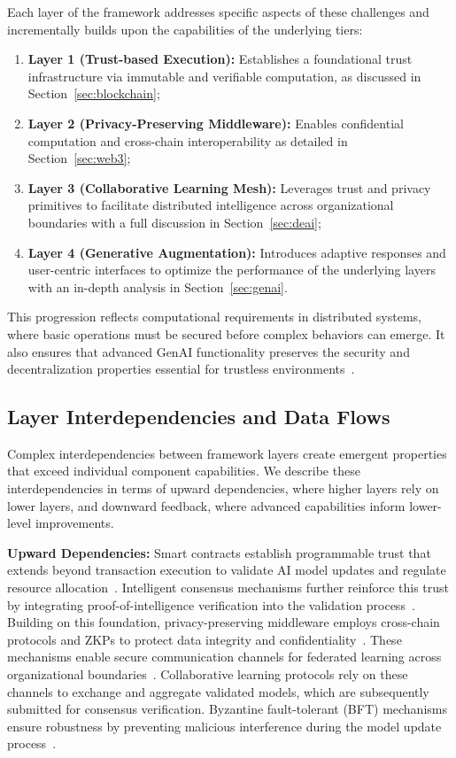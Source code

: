 \documentclass[5p,twocolumn]{elsarticle}
\begin{document}
Each layer of the framework addresses specific aspects of these challenges and incrementally builds upon the capabilities of the underlying tiers:
\begin{enumerate}
    \item \textbf{Layer 1 (Trust-based Execution):} Establishes a foundational trust infrastructure via immutable and verifiable computation, as discussed in Section~\ref{sec:blockchain};
    \item \textbf{Layer 2 (Privacy-Preserving Middleware):} Enables confidential computation and cross-chain interoperability as detailed in Section~\ref{sec:web3};
    \item \textbf{Layer 3 (Collaborative Learning Mesh):} Leverages trust and privacy primitives to facilitate distributed intelligence across organizational boundaries with a full discussion in Section~\ref{sec:deai};
    \item \textbf{Layer 4 (Generative Augmentation):} Introduces adaptive responses and user-centric interfaces to optimize the performance of the underlying layers with an in-depth analysis in Section~\ref{sec:genai}.
\end{enumerate}
This progression reflects computational requirements in distributed systems, where basic operations must be secured before complex behaviors can emerge. It also ensures that advanced GenAI functionality preserves the security and decentralization properties essential for trustless environments~\cite{luo2024survey,javadpour2024decentralized}.

\subsection{Layer Interdependencies and Data Flows}
Complex interdependencies between framework layers create emergent properties that exceed individual component capabilities. We describe these interdependencies in terms of upward dependencies, where higher layers rely on lower layers, and downward feedback, where advanced capabilities inform lower-level improvements.

\textbf{Upward Dependencies:} Smart contracts establish programmable trust that extends beyond transaction execution to validate AI model updates and regulate resource allocation~\cite{swain2025smart}. Intelligent consensus mechanisms further reinforce this trust by integrating proof-of-intelligence verification into the validation process~\cite{liu2024blockchainempowered}. Building on this foundation, privacy-preserving middleware employs cross-chain protocols and ZKPs to protect data integrity and confidentiality~\cite{qin2023web3based,kim2023moving}. These mechanisms enable secure communication channels for federated learning across organizational boundaries~\cite{shadmy2024reimagining}. Collaborative learning protocols rely on these channels to exchange and aggregate validated models, which are subsequently submitted for consensus verification. Byzantine fault-tolerant (BFT) mechanisms ensure robustness by preventing malicious interference during the model update process~\cite{shao2023decentralized,zheng2024decentralized}.
\end{document}
